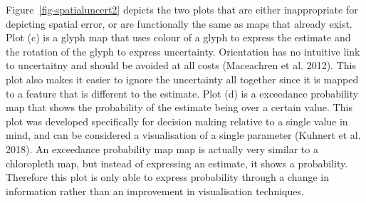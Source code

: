 \documentclass[
  letterpaper,
  DIV=11,
  numbers=noendperiod]{scrartcl}
\begin{document}
Figure~\ref{fig-spatialuncert2} depicts the two plots that are either
inappropriate for depicting spatial error, or are functionally the same
as maps that already exist. Plot (c) is a glyph map that uses colour of
a glyph to express the estimate and the rotation of the glyph to express
uncertainty. Orientation has no intuitive link to uncertaitny and should
be avoided at all costs (Maceachren et al. 2012). This plot also makes
it easier to ignore the uncertainty all together since it is mapped to a
feature that is different to the estimate. Plot (d) is a exceedance
probability map that shows the probability of the estimate being over a
certain value. This plot was developed specifically for decision making
relative to a single value in mind, and can be considered a
visualisation of a single parameter (Kuhnert et al. 2018). An exceedance
probability map map is actually very similar to a chloropleth map, but
instead of expressing an estimate, it shows a probability. Therefore
this plot is only able to express probability through a change in
information rather than an improvement in visualisation techniques.
\end{document}

